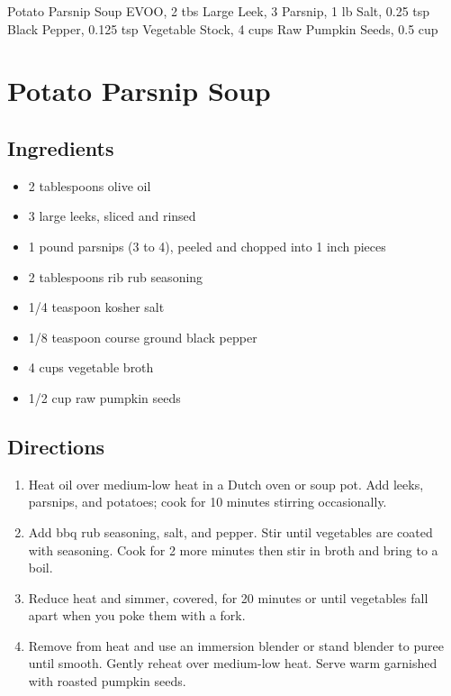 Potato Parsnip Soup
  EVOO, 2 tbs
  Large Leek, 3
  Parsnip, 1 lb
  Salt, 0.25 tsp
  Black Pepper, 0.125 tsp
  Vegetable Stock, 4 cups
  Raw Pumpkin Seeds, 0.5 cup

\section{ Potato Parsnip Soup }

\subsection{ Ingredients }

\begin{itemize}
  \item 2 tablespoons olive oil
  \item 3 large leeks, sliced and rinsed
  \item 1 pound parsnips (3 to 4), peeled and chopped into 1 inch pieces
  \item 2 tablespoons rib rub seasoning
  \item 1/4 teaspoon kosher salt
  \item 1/8 teaspoon course ground black pepper
  \item 4 cups vegetable broth
  \item 1/2 cup raw pumpkin seeds
\end{itemize}

\subsection{ Directions }

\begin{enumerate}
  \item Heat oil over medium-low heat in a Dutch oven or soup pot. Add leeks, parsnips, and potatoes; cook for 10 minutes stirring occasionally. 
  \item Add bbq rub seasoning, salt, and pepper. Stir until vegetables are coated with seasoning. Cook for 2 more minutes then stir in broth and bring to a boil. 
  \item Reduce heat and simmer, covered, for 20 minutes or until vegetables fall apart when you poke them with a fork. 
  \item Remove from heat and use an immersion blender or stand blender to puree until smooth. Gently reheat over medium-low heat. Serve warm garnished with roasted pumpkin seeds. 
\end{enumerate}
